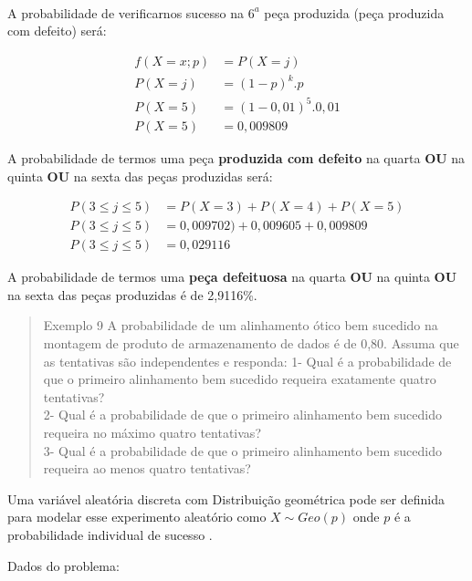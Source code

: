 \documentclass[
]{book}
\begin{document}
~

A probabilidade de verificarnos sucesso na \(6^{a}\) peça produzida (peça produzida com defeito) será:

\begin{align*}
f(X=x; p) & = P(X=j) \\
P(X=j)   & = (1-p)^{k} . p \\
P(X=5)    & = (1-0,01)^{5} . 0,01 \\
P(X=5)    & = 0,009809    
\end{align*}

\hfill\break

A probabilidade de termos uma peça \textbf{produzida com defeito } na quarta \textbf{OU} na quinta \textbf{OU} na sexta das peças produzidas será:

\begin{align*}
P(3 \le j \le 5)  &  = P(X=3) + P(X=4) + P(X=5) \\
P(3 \le j \le 5)  &  = 0,009702) + 0,009605 + 0,009809 \\
P(3 \le j \le 5)  &  = 0,029116 
\end{align*}

\hfill\break

A probabilidade de termos uma \textbf{peça defeituosa} na quarta \textbf{OU} na quinta \textbf{OU} na sexta das peças produzidas é de 2,9116\%.

\hfill\break

\begin{quote}
Exemplo 9 A probabilidade de um alinhamento ótico bem sucedido na montagem de produto de armazenamento de dados é de 0,80. Assuma que as tentativas são independentes e responda:
1- Qual é a probabilidade de que o primeiro alinhamento bem sucedido requeira exatamente quatro tentativas?\\
2- Qual é a probabilidade de que o primeiro alinhamento bem sucedido requeira no máximo quatro tentativas?\\
3- Qual é a probabilidade de que o primeiro alinhamento bem sucedido requeira ao menos quatro tentativas?
\end{quote}

\hfill\break

Uma variável aleatória discreta com Distribuição geométrica pode ser definida para modelar esse experimento aleatório como \(X\sim Geo(p)\) onde \(p\) é a probabilidade individual de sucesso .

\hfill\break

Dados do problema:
\end{document}
